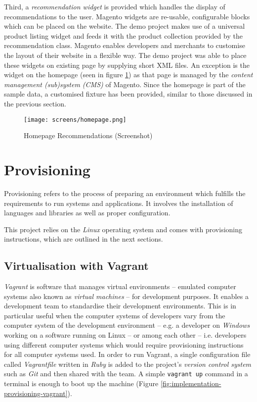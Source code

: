 Third, a \emph{recommendation widget} is provided which handles the display of recommendations to the user. Magento widgets are re-usable, configurable blocks which can be placed on the website. The demo project makes use of a universal product listing widget and feeds it with the product collection provided by the recommendation class. Magento enables developers and merchants to customise the layout of their website in a flexible way. The demo project was able to place these widgets on existing page by supplying short XML files. An exception is the widget on the homepage (seen in figure \ref{fig:implementation-magento-homepage}) as that page is managed by the \emph{content management (sub)system (CMS)} of Magento. Since the homepage is part of the sample data, a customised fixture has been provided, similar to those discussed in the previous section.

\begin{figure}[!ht]
    \texttt{[image: screens/homepage.png]}
    \caption{Homepage Recommendations (Screenshot)}
    \label{fig:implementation-magento-homepage}
\end{figure}

\section{Provisioning}

Provisioning refers to the process of preparing an environment which fulfills the requirements to run systems and applications. It involves the installation of languages and libraries as well as proper configuration.

This project relies on the \emph{Linux} operating system and comes with provisioning instructions, which are outlined in the next sections.

\subsection{Virtualisation with Vagrant}

\emph{Vagrant} is software that manages virtual environments -- emulated computer systems also known as \emph{virtual machines} -- for development purposes. It enables a development team to standardise their development environments. This is in particular useful when the computer systems of developers vary from the computer system of the development environment -- e.g. a developer on \emph{Windows} working on a software running on Linux -- or among each other -- i.e. developers using different computer systems which would require provisioning instructions for all computer systems used. In order to run Vagrant, a single configuration file called \emph{Vagrantfile} written in \emph{Ruby} is added to the project's \emph{version control system} such as \emph{Git} and then shared with the team. A simple \texttt{vagrant up} command in a terminal is enough to boot up the machine (Figure \ref{fig:implementation-provisioning-vagrant}).

